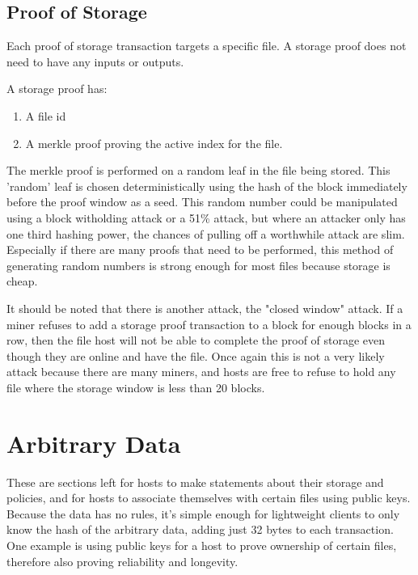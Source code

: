 \documentclass[twocolumn]{article}
\begin{document}
\subsection{Proof of Storage}
Each proof of storage transaction targets a specific file.
A storage proof does not need to have any inputs or outputs.

A storage proof has:
\begin{enumerate}
	\item A file id
	\item A merkle proof proving the active index for the file.
\end{enumerate}

The merkle proof is performed on a random leaf in the file being stored.
This 'random' leaf is chosen deterministically using the hash of the block immediately before the proof window as a seed.
This random number could be manipulated using a block witholding attack or a 51\% attack, but where an attacker only has one third hashing power, the chances of pulling off a worthwhile attack are slim.
Especially if there are many proofs that need to be performed, this method of generating random numbers is strong enough for most files because storage is cheap.


It should be noted that there is another attack, the "closed window" attack.
If a miner refuses to add a storage proof transaction to a block for enough blocks in a row, then the file host will not be able to complete the proof of storage even though they are online and have the file.
Once again this is not a very likely attack because there are many miners, and hosts are free to refuse to hold any file where the storage window is less than 20 blocks.

\section{Arbitrary Data}
These are sections left for hosts to make statements about their storage and policies, and for hosts to associate themselves with certain files using public keys.
Because the data has no rules, it's simple enough for lightweight clients to only know the hash of the arbitrary data, adding just 32 bytes to each transaction.
One example is using public keys for a host to prove ownership of certain files, therefore also proving reliability and longevity.
\end{document}
